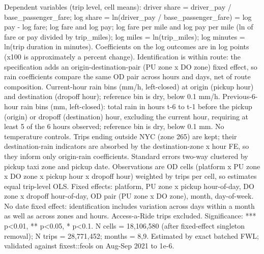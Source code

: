 \par \raggedright 
Dependent variables (trip level, cell means): driver share = driver\_pay / base\_passenger\_fare; log share = ln(driver\_pay / base\_passenger\_fare) = log pay - log fare; log fare and log pay; log fare per mile and log pay per mile (ln of fare or pay divided by trip\_miles); log miles = ln(trip\_miles); log minutes = ln(trip duration in minutes). Coefficients on the log outcomes are in log points (x100 is approximately a percent change). Identification is within route: the specification adds an origin-destination-pair (PU zone x DO zone) fixed effect, so rain coefficients compare the same OD pair across hours and days, net of route composition. Current-hour rain bins (mm/h, left-closed) at origin (pickup hour) and destination (dropoff hour); reference bin is dry, below 0.1 mm/h. Previous-6-hour rain bins (mm, left-closed): total rain in hours t-6 to t-1 before the pickup (origin) or dropoff (destination) hour, excluding the current hour, requiring at least 5 of the 6 hours observed; reference bin is dry, below 0.1 mm. No temperature controls. Trips ending outside NYC (zone 265) are kept; their destination-rain indicators are absorbed by the destination-zone x hour FE, so they inform only origin-rain coefficients. Standard errors two-way clustered by pickup taxi zone and pickup date. Observations are OD cells (platform x PU zone x DO zone x pickup hour x dropoff hour) weighted by trips per cell, so estimates equal trip-level OLS. Fixed effects: platform, PU zone x pickup hour-of-day, DO zone x dropoff hour-of-day, OD pair (PU zone x DO zone), month, day-of-week. No date fixed effect: identification includes variation across days within a month as well as across zones and hours. Access-a-Ride trips excluded. Significance: *** p<0.01, ** p<0.05, * p<0.1. N cells = 18,106,580 (after fixed-effect singleton removal); N trips = 28,771,452; months = 8,9. Estimated by exact batched FWL; validated against fixest::feols on Aug-Sep 2021 to 1e-6.
\par\endgroup
\ifdefined\ifclassloaded
{}
\fi

